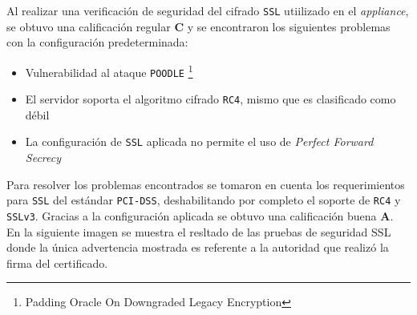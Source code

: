 Al realizar una verificaci\'{o}n de seguridad del cifrado \texttt{SSL} utiilizado en el \textsl{appliance}, se obtuvo una calificaci\'{o}n regular \textbf{C} y se encontraron los siguientes problemas con la configuraci\'{o}n predeterminada:

\begin{itemize}
  \item Vulnerabilidad al ataque \texttt{POODLE} \footnote{Padding Oracle On Downgraded Legacy Encryption}

  \item El servidor soporta el algoritmo cifrado \texttt{RC4}, mismo que es clasificado como d\'{e}bil

  \item La configuraci\'{o}n de \texttt{SSL} aplicada no permite el uso de \textsl{Perfect Forward Secrecy}
\end{itemize}


Para resolver los problemas encontrados se tomaron en cuenta los requerimientos para \texttt{SSL} del est\'{a}ndar \texttt{PCI-DSS}, deshabilitando por completo el soporte de \texttt{RC4} y \texttt{SSLv3}. Gracias a la configuraci\'{o}n aplicada se obtuvo una calificaci\'{o}n buena \textbf{A}. En la siguiente imagen se muestra el resltado de las pruebas de seguridad SSL donde la \'{u}nica advertencia mostrada es referente a la autoridad que realiz\'{o} la firma del certificado.



